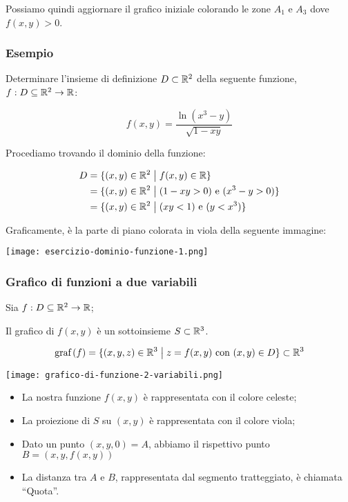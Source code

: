 Possiamo quindi aggiornare il grafico iniziale colorando le zone \(A_1\) e \(A_3\) dove \(f(x,y) > 0\).

\subsubsection*{Esempio}

Determinare l'insieme di definizione \(D \subset \mathbb{R}^2\) della seguente funzione, \(f: D \subseteq \mathbb{R}^2 \to \mathbb{R} \):

\[f(x,y) = \frac{\ln(x^3 - y)}{\sqrt{1-xy}}\]

Procediamo trovando il dominio della funzione:

\begin{align*}
    D & = \{(x,y) \in \mathbb{R}^2 \;\big|\; f(x,y) \in \mathbb{R} \}                      \\
      & = \{(x,y) \in \mathbb{R}^2 \;\big|\; (1-xy > 0) \text{ e } (x^3 -y > 0) \} \\
      & = \{(x,y) \in \mathbb{R}^2 \;\big|\; (xy < 1) \text{ e } (y < x^3) \}      \\
\end{align*}

Graficamente, è la parte di piano colorata in viola della seguente immagine:

\begin{center}
    \texttt{[image: esercizio-dominio-funzione-1.png]}
\end{center}

\newpage
\subsubsection{Grafico di funzioni a due variabili}

Sia \(f: D \subseteq \mathbb{R}^2 \to \mathbb{R} \);

Il grafico di \(f(x,y)\) è un sottoinsieme \(S \subset \mathbb{R}^3 \).

\[\text{graf}\left(f\right) = \{(x,y,z) \in \mathbb{R}^3 \;\big|\; z = f(x,y) \text{ con } (x,y) \in D\} \subset \mathbb{R}^3\]

\begin{center}
    \texttt{[image: grafico-di-funzione-2-variabili.png]}
\end{center}

\begin{itemize}
    \item La nostra funzione \(f(x,y)\) è rappresentata con il colore celeste;
    \item La proiezione di \(S\) su \((x,y)\) è rappresentata con il colore viola;
    \item Dato un punto \((x,y,0) = A\), abbiamo il rispettivo punto \(B = (x,y,f(x,y))\)
    \item La distanza tra \(A\) e \(B\), rappresentata dal segmento tratteggiato, è chiamata ``Quota''.
\end{itemize}


